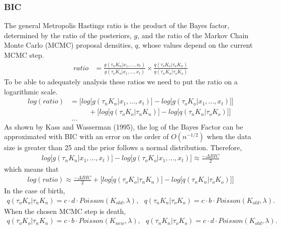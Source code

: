 \documentclass[submit]{smj}
\begin{document}
\subsubsection{BIC} 
The general Metropolis Hastings ratio is the product of the Bayes factor, determined by the ratio of the posteriors, $g$, and the ratio of the Markov Chain Monte Carlo (MCMC) proposal densities, $q$, whose values depend on the current MCMC step. 
\begin{align*}
ratio &= \frac{g(\tau_{n} K_{n} | x_1,\dots,x_t) }{g(\tau_{o} K_{o} | x_1,\dots,x_t)} \times \frac{q(\tau_{o} K_{o} | \tau_{n} K_{n})}{q(\tau_{n} K_{n}| \tau_{o} K_{o})}
\end{align*}
To be able to adequately analysis these ratios we need to put the ratio on a logarithmic scale.  
\begin{align*}
log(ratio) & =\Big[ log \big[ g(\tau_{n} K_{n} | x_1,\dots,x_t)
\big] - log \big[ g(\tau_{o} K_{o} | x_1,\dots,x_t)\big] \Big] \\
& \ \ \ \ \ \ \ \ \ \ \ \ + 
\Big[ log \big[ q(\tau_{o} K_{o} | \tau_{n} K_{n}) \big] - log \big[ q(\tau_{n} K_{n}| \tau_{o} K_{o})  \big] \Big] \\
& \ …
\end{align*}
As shown by Kass and Wasserman (1995), the log of the Bayes Factor can be approximated with BIC with an error on the order of $O(n^{-1/2})$ when the data size is greater than 25 and the prior follows a normal distribution.
Therefore, 
\begin{align*}
 log \big[ g(\tau_{n} K_{n} | x_1,\dots,x_t)
\big] - log \big[ g(\tau_{o} K_{o} | x_1,\dots,x_t)\big]  \approx \frac{- \Delta BIC}{2} 
\end{align*}
which means that 
\begin{align*}
log(ratio) \approx \frac{- \Delta BIC}{2} + 
\Big[ log \big[ q(\tau_{o} K_{o} | \tau_{n} K_{n}) \big] - log \big[ q(\tau_{n} K_{n}| \tau_{o} K_{o})  \big] \Big]
\end{align*}
In the case of birth, 
\begin{align*} 
q(\tau_{o} K_{o} | \tau_{n} K_{n}) = c \cdot d \cdot Poisson(K_{old} , \lambda), \ \ \ q(\tau_{n} K_{n} | \tau_{o} K_{o}) = c \cdot b \cdot Poisson(K_{old} , \lambda).
\end{align*}
When the chosen MCMC step is death,  \begin{align*}
q(\tau_{o} K_{o} | \tau_{n} K_{n}) = c \cdot b \cdot Poisson(K_{new} , \lambda) , \ \ \ q(\tau_{n} K_{n} | \tau_{o} K_{o}) = c \cdot d \cdot Poisson(K_{old} , \lambda).
\end{align*} 
\end{document}
